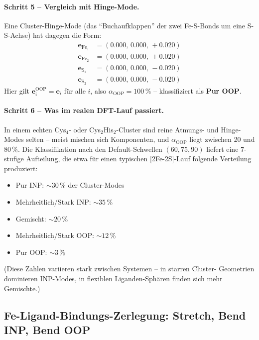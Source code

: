 \documentclass[11pt,a4paper,twoside]{article}
\newcommand{\OOP}{\mathrm{OOP}}
\theoremstyle{remark}
\begin{document}
\paragraph{Schritt 5 -- Vergleich mit Hinge-Mode.}
Eine Cluster-Hinge-Mode (das "`Buchaufklappen"' der zwei Fe-S-Bonds
um eine S-S-Achse) hat dagegen die Form:
\begin{align*}
  \mathbf{e}_{\text{Fe}_1} &= (0.000,\, 0.000,\, +0.020) \\
  \mathbf{e}_{\text{Fe}_2} &= (0.000,\, 0.000,\, +0.020) \\
  \mathbf{e}_{\text{S}_1}  &= (0.000,\, 0.000,\, -0.020) \\
  \mathbf{e}_{\text{S}_2}  &= (0.000,\, 0.000,\, -0.020)
\end{align*}
Hier gilt $\mathbf{e}_i^\text{OOP} = \mathbf{e}_i$ f\"ur alle $i$,
also $\alpha_{\OOP} = 100\,\%$ -- klassifiziert als \textbf{Pur OOP}.

\paragraph{Schritt 6 -- Was im realen DFT-Lauf passiert.}
In einem echten Cys$_4$- oder Cys$_2$His$_2$-Cluster sind reine
Atmungs- und Hinge-Modes selten -- meist mischen sich Komponenten,
und $\alpha_{\OOP}$ liegt zwischen 20 und 80\,\%. Die Klassifikation
nach den Default-Schwellen $(60, 75, 90)$ liefert eine 7-stufige
Aufteilung, die etwa f\"ur einen typischen [2Fe-2S]-Lauf
folgende Verteilung produziert:
\begin{itemize}\setlength{\itemsep}{0pt}
  \item Pur INP: $\sim 30$\,\% der Cluster-Modes
  \item Mehrheitlich/Stark INP: $\sim 35$\,\%
  \item Gemischt: $\sim 20$\,\%
  \item Mehrheitlich/Stark OOP: $\sim 12$\,\%
  \item Pur OOP: $\sim 3$\,\%
\end{itemize}
(Diese Zahlen variieren stark zwischen Systemen -- in starren Cluster-
Geometrien dominieren INP-Modes, in flexiblen Liganden-Sph\"aren
finden sich mehr Gemischte.)

\subsection{Fe-Ligand-Bindungs-Zerlegung: Stretch, Bend INP, Bend OOP}
\label{sec:fe-lig-decomp}
\end{document}
